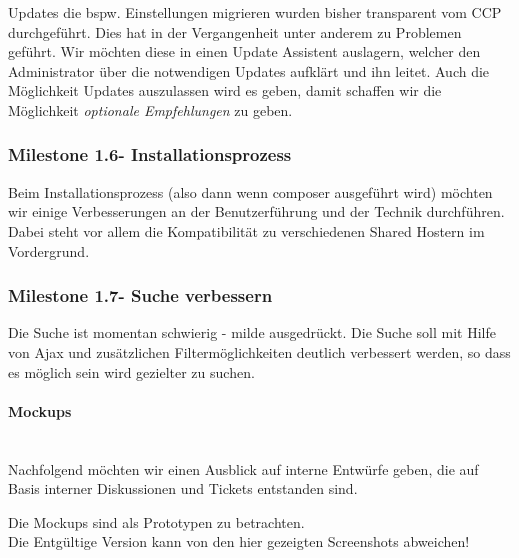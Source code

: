 \documentclass[
paper=a4,
draft=false,%
fontsize=10pt%
]{scrartcl}
\begin{document}
Updates die bspw. Einstellungen migrieren wurden bisher transparent vom CCP durchgeführt. Dies hat in der Vergangenheit unter anderem zu Problemen geführt. Wir möchten diese in einen Update Assistent auslagern, welcher den Administrator über die notwendigen Updates aufklärt und ihn leitet. Auch die Möglichkeit Updates auszulassen wird es geben, damit schaffen wir die Möglichkeit \textit{optionale Empfehlungen} zu geben.

\subsubsection[Milestone 1.6 - Installationsprozess]{Milestone 1.6\footnotemark - Installationsprozess}
\label{subsec:ccc-milestone-1.6}

Beim Installationsprozess (also dann wenn composer ausgeführt wird) möchten wir einige Verbesserungen an der Benutzerführung und der Technik durchführen. Dabei steht vor allem die Kompatibilität zu verschiedenen Shared Hostern im Vordergrund.

\subsubsection[Milestone 1.7 - Suche verbessern]{Milestone 1.7\footnotemark - Suche verbessern}
\label{subsec:ccc-milestone-1.7}

Die Suche ist momentan schwierig - milde ausgedrückt. Die Suche soll mit Hilfe von Ajax und zusätzlichen Filtermöglichkeiten deutlich verbessert werden, so dass es möglich sein wird gezielter zu suchen.

\paragraph{Mockups} ~\\
Nachfolgend möchten wir einen Ausblick auf interne Entwürfe geben, die auf Basis interner Diskussionen und Tickets entstanden sind.

\begin{danger}
Die Mockups sind als Prototypen zu betrachten. \\
Die Entgültige Version kann von den hier gezeigten Screenshots abweichen!
\end{danger}
\end{document}
